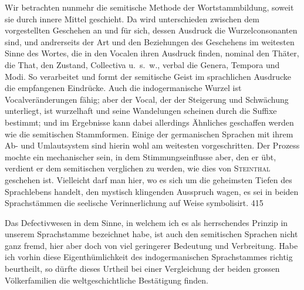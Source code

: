 Wir betrachten nunmehr die semitische Methode der Wortstammbildung, soweit sie durch innere Mittel geschieht. Da wird unterschieden zwischen dem vorgestellten Geschehen an und für sich, dessen Ausdruck die Wurzelconsonanten sind, und andrerseits der Art und den Beziehungen des Geschehens im weitesten Sinne des Wortes, die in den Vocalen ihren Ausdruck finden, nominal den Thäter, die That, den Zustand, Collectiva u.~s.~w., verbal die Genera, Tempora und Modi. So verarbeitet und formt der semitische Geist im sprachlichen Ausdrucke die empfangenen \label{fp.393} Eindrücke. Auch die indogermanische Wurzel ist  Vocalveränderungen fähig; aber der Vocal, der der Steigerung und Schwächung unterliegt, ist wurzelhaft und seine Wandelungen scheinen durch die Suffixe bestimmt; und im Ergebnisse kann dabei allerdings Ähnliches geschaffen werden wie die semitischen Stammformen. Einige der germanischen Sprachen mit ihrem Ab- und Umlautsystem sind hierin wohl am weitesten vorgeschritten. Der Prozess mochte ein mechanischer sein, in dem Stimmungseinflusse aber, den er übt, verdient er dem semitischen verglichen zu werden, wie dies von \textsc{Steinthal} geschehen ist.  Vielleicht darf man hier, wo es sich um die geheimsten Tiefen des Sprachlebens handelt, den mystisch klingenden Ausspruch wagen, es sei in beiden Sprachstämmen die seelische Verinnerlichung auf  Weise symbolisirt.  {\textbar}{\textbar}415{\textbar}{\textbar}\label{sp.415} 

Das Defectivwesen in dem Sinne, in welchem ich es als herrschendes Prinzip in unserem Sprachstamme bezeichnet habe, ist auch den semitischen Sprachen nicht ganz fremd, hier aber doch von viel geringerer Bedeutung und Verbreitung. Habe ich vorhin diese Eigenthümlichkeit des indogermanischen Sprachstammes richtig beurtheilt, so dürfte dieses Urtheil bei einer Vergleichung der beiden grossen Völkerfamilien die weltgeschichtliche Bestätigung finden.

